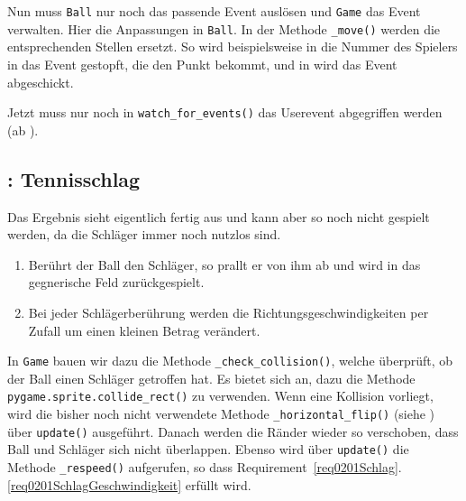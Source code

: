 
Nun muss \texttt{Ball} nur noch das passende Event auslösen und \texttt{Game} das Event verwalten. Hier die Anpassungen in \texttt{Ball}. In der Methode \texttt{\_move()} werden die entsprechenden Stellen ersetzt. So wird beispielsweise in  die Nummer des Spielers in das Event gestopft, die den Punkt bekommt, und in  wird das Event abgeschickt.


Jetzt muss nur noch in \texttt{watch\_for\_events()} das Userevent abgegriffen werden (ab ).




\subsection{: Tennisschlag}

Das Ergebnis sieht eigentlich fertig aus und kann aber so noch nicht gespielt werden, da die Schläger immer noch nutzlos sind.


\begin{enumerate}
	\item Berührt der Ball den Schläger, so prallt er von ihm ab und wird in das gegnerische Feld zurückgespielt.\label{req0201SchlagZurück}
	\item Bei jeder Schlägerberührung werden die Richtungsgeschwindigkeiten per Zufall um einen kleinen Betrag verändert.\label{req0201SchlagGeschwindigkeit}
\end{enumerate}
\er

In \texttt{Game} bauen wir dazu die Methode \texttt{\_check\_collision()}, welche überprüft, ob der Ball einen Schläger getroffen hat. Es bietet sich an, dazu die Methode \texttt{ pygame\-.sprite\-.coll\-ide\_rect()} zu verwenden. Wenn eine Kollision vorliegt, wird die bisher noch nicht verwendete Methode \texttt{\_horizontal\_flip()} (siehe ) über \texttt{update()} ausgeführt. Danach werden die Ränder wieder so verschoben, dass Ball und Schläger sich nicht überlappen. Ebenso wird über \texttt{update()} die Methode \texttt{\_respeed()} aufgerufen, so dass Requirement~\ref{req0201Schlag}.\ref{req0201SchlagGeschwindigkeit} erfüllt wird.

